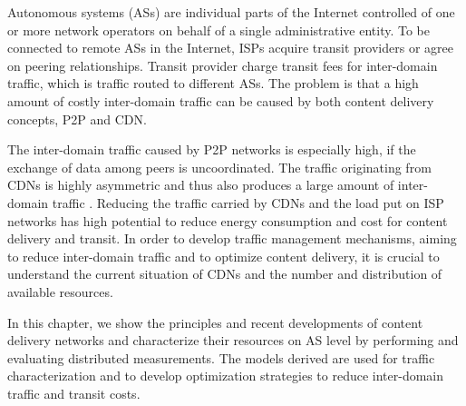 Autonomous systems (ASs) are individual parts of the Internet controlled of one or more network operators on behalf of a single administrative entity.
To be connected to remote ASs in the Internet, ISPs acquire transit providers or agree on peering relationships.
Transit provider charge transit fees for inter-domain traffic, which is traffic routed to different ASs.
The problem is that a high amount of costly inter-domain traffic can be caused by both content delivery concepts, P2P and CDN.

The inter-domain traffic caused by P2P networks is especially high, if the exchange of data among peers is uncoordinated.
The traffic originating from CDNs is highly asymmetric and thus also produces a large amount of inter-domain traffic \cite{labovitz2010internet}.
Reducing the traffic carried by CDNs and the load put on ISP networks has high potential to reduce energy consumption and cost for content delivery and transit.
In order to develop traffic management mechanisms, aiming to reduce inter-domain traffic and to optimize content delivery, it is crucial to understand the current situation of CDNs and the number and distribution of available resources.



In this chapter, we show the principles and recent developments of content delivery networks and characterize their resources on AS level by performing and evaluating distributed measurements.
The models derived are used for traffic characterization and to develop optimization strategies to reduce inter-domain traffic and transit costs.



